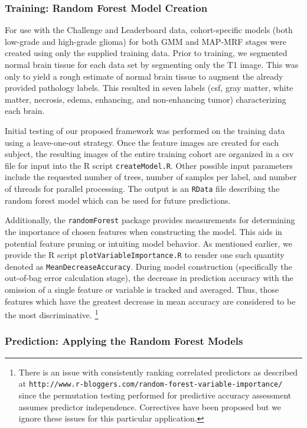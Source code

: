 \documentclass[final,5p,times,twocolumn]{elsarticle}
\begin{document}
\subsubsection{Training:  Random Forest Model Creation}

For use with the Challenge and Leaderboard data, cohort-specific models (both 
low-grade and 
high-grade glioma) for both GMM and MAP-MRF stages were created using only the 
supplied training data.  Prior to training, we segmented normal brain tissue \cite{avants2011}
for each data set by segmenting only the T1 image.  This was only to yield
a rough estimate of normal brain tissue to augment the already provided 
pathology labels.  This resulted in seven labels (csf, gray matter, white matter,
necrosis, edema, enhancing, and non-enhancing tumor)
characterizing each brain.

Initial testing of our proposed framework was performed 
on the training data using a leave-one-out strategy.  Once the
feature images are created for each subject, the resulting images of the entire
training cohort are organized in a csv file for input into the R script
{\tt createModel.R}.  Other possible input parameters include the requested 
number of trees, number of samples per label, and number of threads for parallel
processing.  The output is an {\tt RData} file describing the random forest
model which can be used for future predictions.
 
Additionally, the {\tt randomForest} package provides  measurements 
for determining the importance of chosen features when constructing the model.  
This aids in potential feature pruning or intuiting model behavior.  As mentioned
earlier, we provide the R script {\tt plotVariableImportance.R} to render
one such quantity denoted as {\tt MeanDecreaseAccuracy}.  During model construction
(specifically the out-of-bag error calculation stage), the decrease in prediction accuracy
with the omission of a single feature or variable is tracked and averaged.  Thus,
those features which have the greatest decrease in mean accuracy are considered
to be the most discriminative.%
\footnote{
There is an issue with consistently ranking correlated predictors as described at {\tt http://www.r-bloggers.com/random-forest-variable-importance/} since the permutation testing performed for predictive accuracy assessment assumes predictor independence.  Correctives have been proposed but we ignore these issues for this particular application.
}

\subsubsection{Prediction:  Applying the Random Forest Models}
\end{document}
